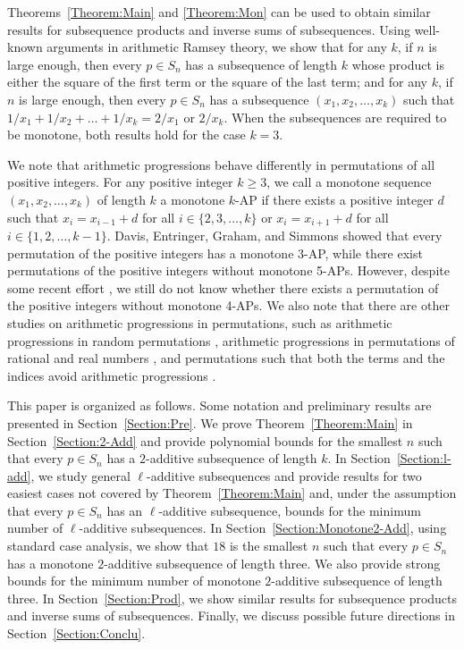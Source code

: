 \documentclass[10pt,a4paper]{amsart}
\begin{document}
Theorems~\ref{Theorem:Main} and \ref{Theorem:Mon} can be used to obtain similar results for subsequence products and inverse sums of subsequences. Using well-known arguments in arithmetic Ramsey theory, we show that for any $k$, if $n$ is large enough, then every $p\in S_n$ has a subsequence of length $k$ whose product is either the square of the first term or the square of the last term; and for any $k$, if $n$ is large enough, then every $p\in S_n$ has a subsequence $(x_1,x_2,\ldots,x_k)$ such that $1/x_1+1/x_2+\ldots+1/x_k=2/x_1$ or $2/x_k$. When the subsequences are required to be monotone, both results hold for the case $k=3$.

We note that arithmetic progressions behave differently in permutations of all positive integers. For any positive integer $k\geq3$, we call a monotone sequence $(x_1,x_2,\ldots,x_k)$ of length $k$ a monotone $k$-AP if there exists a positive integer $d$ such that $x_i=x_{i-1}+d$ for all $i\in\{2,3,\ldots,k\}$ or $x_{i}=x_{i+1}+d$ for all $i\in\{1,2,\ldots,k-1\}$. Davis, Entringer, Graham, and Simmons \cite{DEGS1977} showed that every permutation of the positive integers has a monotone $3$-AP, while there exist permutations of the positive integers without monotone 5-APs. However, despite some recent effort \cite{Adenwalla2024,Geneson2019,LeSaulnierVijay2011}, we still do not know whether there exists a permutation of the positive integers without monotone 4-APs. We also note that there are other studies on arithmetic progressions in permutations, such as arithmetic progressions in random permutations \cite{GZ2021}, arithmetic progressions in permutations of rational and real numbers \cite{ABJ2011}, and permutations such that both the terms and the indices avoid arithmetic progressions \cite{ES2017,Hegarty2004,HM2015,JS2015,SS2018}.

This paper is organized as follows. Some notation and preliminary results are presented in Section~\ref{Section:Pre}.  We prove Theorem~\ref{Theorem:Main} in Section~\ref{Section:2-Add} and provide polynomial bounds for the smallest $n$ such that every $p\in S_n$ has a $2$-additive subsequence of length $k$. In Section~\ref{Section:l-add}, we study general $\ell$-additive subsequences and provide results for two easiest cases not covered by Theorem~\ref{Theorem:Main} and, under the assumption that every $p\in S_n$ has an $\ell$-additive subsequence, bounds for the minimum number of $\ell$-additive subsequences. In Section~\ref{Section:Monotone2-Add}, using standard case analysis, we show that $18$ is the smallest $n$ such that every $p\in S_{n}$ has a monotone $2$-additive subsequence of length three. We also provide strong bounds for the minimum number of monotone $2$-additive subsequence of length three. In Section~\ref{Section:Prod}, we show similar results for subsequence products and inverse sums of subsequences. Finally, we discuss possible future directions in Section~\ref{Section:Conclu}.
\end{document}
